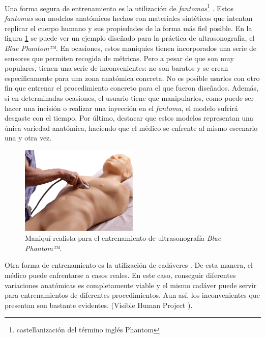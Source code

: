 Una forma segura de entrenamiento es la utilización de \emph{fantomas}\footnote{castellanización del término inglés Phantom} \cite{phantomra}. 
Estos \emph{fantomas} son modelos anatómicos hechos con materiales sintéticos que intentan replicar el cuerpo humano y sus propiedades de la forma más fiel posible. En la figura \ref{fig:phantom} se puede ver un ejemplo diseñado para la práctica de ultrasonografía, el \emph{Blue Phantom™}\cite{BluePH}. En ocasiones, estos maniquíes tienen incorporados una serie de sensores que permiten recogida de métricas. Pero a pesar de que son muy populares, tienen una serie de inconvenientes: no son baratos y se crean específicamente para una zona anatómica concreta. No es posible usarlos con otro fin que entrenar el procedimiento concreto para el que fueron diseñados. Además, si en determinadas ocasiones, el usuario tiene que manipularlos, como puede ser hacer una incisión o realizar una inyección en el \emph{fantoma}, el modelo sufrirá desgaste con el tiempo. Por último, destacar que estos modelos representan una única variedad anatómica, haciendo que el médico se enfrente al mismo escenario una y otra vez.
\begin{figure}[h]
   \centering
    \includegraphics[width=0.5\textwidth]{IMG/fast_trauma.jpg}
    \caption{Maniquí realista para el entrenamiento de ultrasonografía  \emph{Blue Phantom™}\cite{BluePH}. }
   \label{fig:phantom}
\end{figure}

Otra forma de entrenamiento es la utilización de cadáveres \cite{Tsui2007}. De esta manera, el médico puede enfrentarse a casos reales. En este caso, conseguir diferentes variaciones anatómicas es completamente viable y el mismo cadáver puede servir para entrenamientos de diferentes procedimientos. Aun así, los inconvenientes que presentan son bastante evidentes.  (Visible Human Project \cite{ackerman1998visible}).

